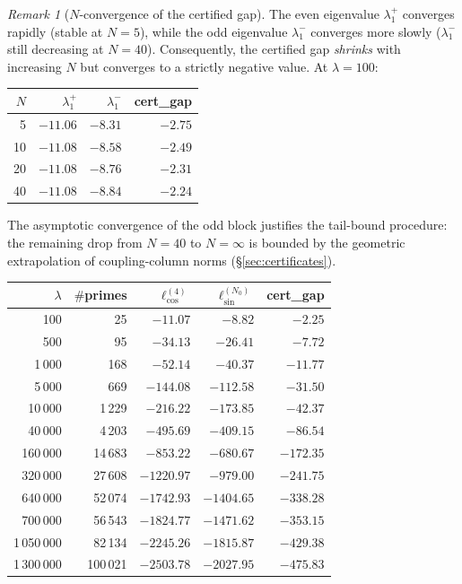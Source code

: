 \documentclass[12pt,a4paper]{article}
\theoremstyle{definition}
\theoremstyle{remark}
\newtheorem{remark}[theorem]{Remark}
\begin{document}
\begin{remark}[$N$-convergence of the certified gap]
\label{rem:N-convergence}
The even eigenvalue $\lambda_1^+$ converges rapidly (stable at $N = 5$), while the odd eigenvalue $\lambda_1^-$ converges more slowly ($\lambda_1^-$ still decreasing at $N = 40$). Consequently, the certified gap \emph{shrinks} with increasing $N$ but converges to a strictly negative value. At $\lambda = 100$:

\begin{center}
\small
\begin{tabular}{r|r|r|r}
$N$ & $\lambda_1^+$ & $\lambda_1^-$ & cert\_gap \\\hline
5 & $-11.06$ & $-8.31$ & $-2.75$ \\
10 & $-11.08$ & $-8.58$ & $-2.49$ \\
20 & $-11.08$ & $-8.76$ & $-2.31$ \\
40 & $-11.08$ & $-8.84$ & $-2.24$
\end{tabular}
\end{center}

\noindent The asymptotic convergence of the odd block justifies the tail-bound procedure: the remaining drop from $N = 40$ to $N = \infty$ is bounded by the geometric extrapolation of coupling-column norms (\S\ref{sec:certificates}).
\end{remark}

\begin{center}
\small
\renewcommand{\arraystretch}{1.15}
\begin{tabular}{r|r|r|r|r}
$\lambda$ & $\#$primes & $\ell_{\cos}^{(4)}$ & $\ell_{\sin}^{(N_0)}$ & cert\_gap \\\hline
100   & 25     & $-11.07$ & $-8.82$   & $-2.25$ \\
500   & 95     & $-34.13$ & $-26.41$  & $-7.72$ \\
1\,000 & 168   & $-52.14$ & $-40.37$  & $-11.77$ \\
5\,000 & 669   & $-144.08$ & $-112.58$ & $-31.50$ \\
10\,000 & 1\,229 & $-216.22$ & $-173.85$ & $-42.37$ \\
40\,000 & 4\,203 & $-495.69$ & $-409.15$ & $-86.54$ \\
160\,000 & 14\,683 & $-853.22$ & $-680.67$ & $-172.35$ \\
320\,000 & 27\,608 & $-1220.97$ & $-979.00$ & $-241.75$ \\
640\,000 & 52\,074 & $-1742.93$ & $-1404.65$ & $-338.28$ \\
700\,000 & 56\,543 & $-1824.77$ & $-1471.62$ & $-353.15$ \\
1\,050\,000 & 82\,134 & $-2245.26$ & $-1815.87$ & $-429.38$ \\
1\,300\,000 & 100\,021 & $-2503.78$ & $-2027.95$ & $-475.83$
\end{tabular}
\end{center}
\end{document}
